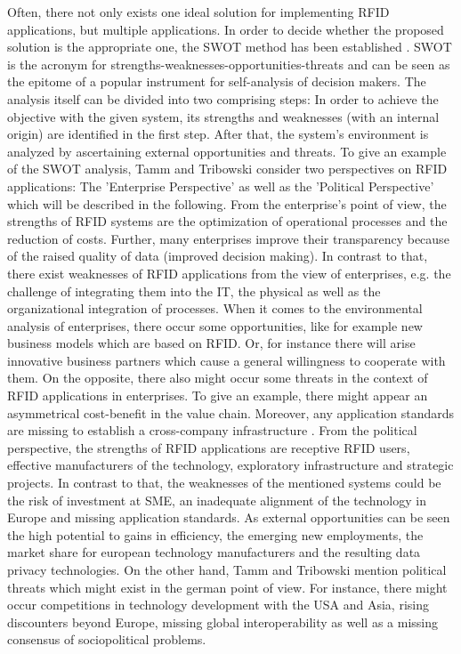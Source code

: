Often, there not only exists one ideal solution for implementing RFID applications, but multiple applications. In order to decide whether the proposed solution is the appropriate one, the \ac{SWOT} method has been established \cite[p.47 ff.]{fokus}. SWOT is the acronym for strengths-weaknesses-opportunities-threats and can be seen as the epitome of a popular instrument for self-analysis of decision makers. The analysis itself can be divided into two comprising steps: In order to achieve the objective with the given system, its strengths and weaknesses (with an internal origin) are identified in the first step. After that, the system's environment is analyzed by ascertaining external opportunities and threats. 
To give an example of the SWOT analysis, Tamm and Tribowski \cite[p.47 ff.]{fokus} consider two perspectives on RFID applications: The 'Enterprise Perspective' as well as the 'Political Perspective' which will be described in the following. 
From the enterprise's point of view, the strengths of RFID systems are the optimization of operational processes and the reduction of costs. Further, many enterprises improve their transparency because of the raised quality of data (improved decision making). In contrast to that, there exist weaknesses of RFID applications from the view of enterprises, e.g. the challenge of integrating them into the IT, the physical as well as the organizational integration of processes. When it comes to the environmental analysis of enterprises, there occur some opportunities, like for example new business models which are based on RFID. Or, for instance there will arise innovative business partners which cause a general willingness to cooperate with them. On the opposite, there also might occur some threats in the context of RFID applications in enterprises. To give an example, there might appear an asymmetrical cost-benefit in the value chain. Moreover, any application standards are missing to establish a cross-company infrastructure \cite[p.47 ff.]{fokus}.
From the political perspective, the strengths of RFID applications are receptive RFID users, effective manufacturers of the technology, exploratory infrastructure and strategic projects. In contrast to that, the weaknesses of the mentioned systems could be the risk of investment at \ac{SME}, an inadequate alignment of the technology in Europe and missing application standards. As external opportunities can be seen the high potential to gains in efficiency, the emerging new employments, the market share for european technology manufacturers and the resulting data privacy technologies. On the other hand,  Tamm and Tribowski \cite[p.47 ff.]{fokus} mention political threats which might exist in the german point of view. For instance, there might occur competitions in technology development with the USA and Asia, rising discounters beyond Europe, missing global interoperability as well as a missing consensus of sociopolitical problems. 

